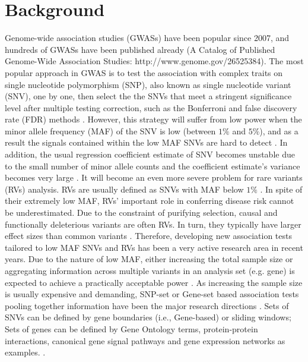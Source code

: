 \documentclass[12pt]{article}
\begin{document}
\section{Background}\label{sec:background}
\doublespacing
Genome-wide association studies (GWASs) have been popular since 2007, and hundreds of GWASs have been published already (A Catalog of Published Genome-Wide Association Studies: http://www.genome.gov/26525384). The most popular approach in GWAS is to test the association with complex traits on single nucleotide polymorphism (SNP), also known as single nucleotide variant (SNV), one by one, then select the the SNVs that meet a stringent significance level after multiple testing correction, such as the Bonferroni and false discovery rate (FDR) methods \cite{McCarthy2008,Hirschhorn2005}. However, this strategy will suffer from low power when the minor allele frequency (MAF) of the SNV is low (between $1\%$ and $5\%$), and as a result the signals contained within the low MAF SNVs are hard to detect \cite{Sham2014}. In addition, the usual regression coefficient estimate of SNV becomes unstable due to the small number of minor allele counts and the coefficient estimate's variance becomes very large \cite{Sham2014}. It will become an even more severe problem for rare variants (RVs) analysis. RVs are usually defined as SNVs with MAF below $1\%$ \cite{Bansal2010}. In spite of their extremely low MAF, RVs' important role in conferring disease risk cannot be underestimated. Due to the constraint of purifying selection, causal and functionally deleterious variants are often RVs. In turn, they typically have larger effect sizes than common variants \cite{Fu2013,Bansal2010,Sham2014,McCarthy2008}. Therefore, developing new association tests tailored to low MAF SNVs and RVs has been a very active research area in recent years. Due to the nature of low MAF, either increasing the total sample size or aggregating information across multiple variants in an analysis set (e.g. gene) is expected to achieve a practically acceptable power \cite{Capanu2011,Basu2011,Bansal2010,Sham2014}. As increasing the sample size is usually expensive and demanding, SNP-set or Gene-set based association tests pooling together information have been the major research directions \cite{Ye2011,Pinto2010,Sham2014}. Sets of SNVs can be defined by gene boundaries (i.e., Gene-based) or sliding windows; Sets of genes can be defined by Gene Ontology terms, protein-protein interactions, canonical gene signal pathways and gene expression networks as examples. \cite{Sham2014,DelaCruz2010,Weng2011,Wang2010,Wei2012a}.
\end{document}
